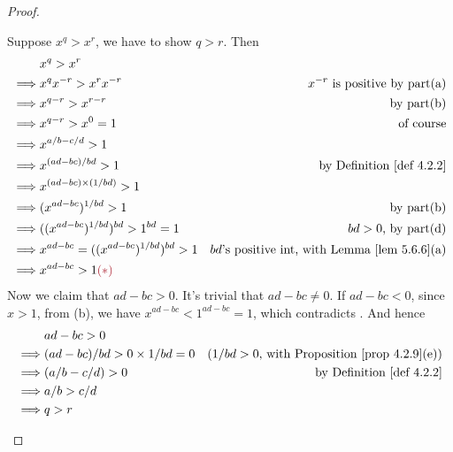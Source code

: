 \begin{proof}
\begin{enumerate}
\begin{itemize}
        Suppose \(x^q > x^r\), we have to show \(q > r\).
        Then
        \begin{align*}
                     & x^q > x^r \\
            \implies & x^q x^{-r} > x^r x^{-r} & \text{\(x^{-r}\) is positive by part(a)}\\
            \implies & x^{q - r} > x^{r - r} & \text{by part(b)} \\
            \implies & x^{q - r} > x^0 = 1 & \text{of course} \\
            \implies & x^{a/b - c/d} > 1 & \\
            \implies & x^{(ad - bc)/bd} > 1 & \text{by \DEF{4.2.2}} \\
            \implies & x^{(ad - bc) \X (1/bd)} > 1 \\
            \implies & (x^{ad - bc})^{1/bd} > 1 & \text{by part(b)} \\
            \implies & ((x^{ad - bc})^{1/bd})^{bd} > 1^{bd} = 1 & \text{\(bd > 0\), by part(d)} \\
            \implies & x^{ad - bc} = ((x^{ad - bc})^{1/bd})^{bd} > 1 & \text{\(bd\)'s positive int, with \LEM{5.6.6}(a)} \\
            \implies & x^{ad - bc} > 1 \MAROON{(*)}
        \end{align*}
        Now we claim that \(ad - bc > 0\).
        It's trivial that \(ad - bc \neq 0\).
        If \(ad - bc < 0\), since \(x > 1\), from (b), we have \(x^{ad - bc} < 1^{ad - bc} = 1\), which contradicts \MAROON{(*)}.
        And hence
        \begin{align*}
                     & ad - bc > 0 \\
            \implies & (ad - bc)/bd > 0 \X 1/bd = 0 & \text{(\(1/bd > 0\), with \PROP{4.2.9}(e))} \\
            \implies & (a/b - c/d) > 0 & \text{by \DEF{4.2.2}} \\
            \implies & a/b > c/d \\
            \implies & q > r
        \end{align*}
    

\end{itemize}
\end{enumerate}
\end{proof}
